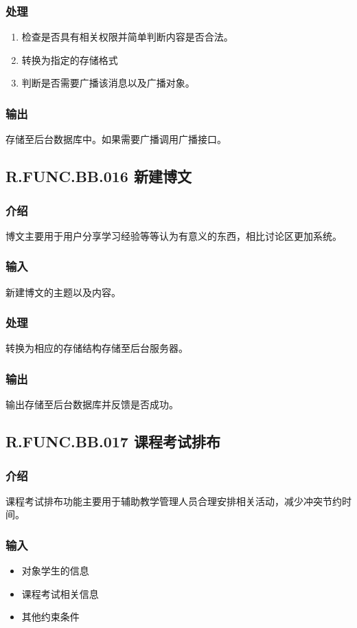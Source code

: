 \begin{enumerate}
    \subsubsection{处理}
    \begin{enumerate}
      \item 检查是否具有相关权限并简单判断内容是否合法。
      \item 转换为指定的存储格式
      \item 判断是否需要广播该消息以及广播对象。
    \end{enumerate}
    \subsubsection{输出}
    存储至后台数据库中。如果需要广播调用广播接口。

  \subsection{R.FUNC.BB.016 新建博文}
    \subsubsection{介绍}
    博文主要用于用户分享学习经验等等认为有意义的东西，相比讨论区更加系统。
    \subsubsection{输入}
    新建博文的主题以及内容。
    \subsubsection{处理}
    转换为相应的存储结构存储至后台服务器。
    \subsubsection{输出}
    输出存储至后台数据库并反馈是否成功。

  \subsection{R.FUNC.BB.017 课程考试排布}
    \subsubsection{介绍}
    课程考试排布功能主要用于辅助教学管理人员合理安排相关活动，减少冲突节约时间。
    \subsubsection{输入}
    \begin{itemize}
      \item 对象学生的信息
      \item 课程考试相关信息
      \item 其他约束条件
    \end{itemize}

\end{enumerate}
